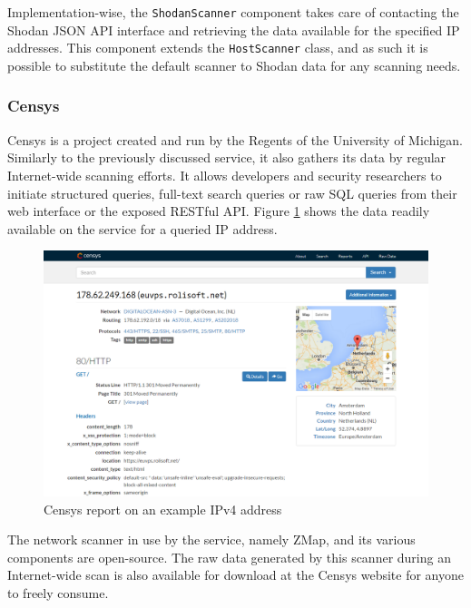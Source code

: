 \documentclass[a4paper,12pt]{article}
\begin{document}
	Implementation-wise, the \texttt{ShodanScanner} component takes care of contacting the Shodan JSON API interface and retrieving the data available for the specified IP addresses. This component extends the \texttt{HostScanner} class, and as such it is possible to substitute the default scanner to Shodan data for any scanning needs.

\subsubsection{Censys} \label{censys}
 

	Censys\cite{censys15} is a project created and run by the Regents of the University of Michigan. Similarly to the previously discussed service, it also gathers its data by regular Internet-wide scanning efforts. It allows developers and security researchers to initiate structured queries, full-text search queries or raw SQL queries from their web interface or the exposed RESTful API. Figure \ref{censysscr} shows the data readily available on the service for a queried IP address.
	
	\begin{figure}[!htbp]
		\centering
		\includegraphics[scale=0.355]{censys.png}
		\caption{Censys report on an example IPv4 address}
		\label{censysscr}
	\end{figure}
	
	The network scanner in use by the service, namely ZMap\cite{zmap13}, and its various components are open-source. The raw data generated by this scanner during an Internet-wide scan is also available for download at the Censys website for anyone to freely consume.
	
\end{document}
